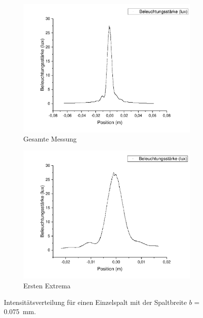 \documentclass[
	a4paper,
	12pt,
	pagesize,
	ngerman
]{scrartcl}
\begin{document}
	\begin{figure}[H]
		\centering
		\begin{subfigure}{.5\textwidth}
			\centering
			\includegraphics[width=1\linewidth]{Einzelspalt0-075mm}
			\caption{Gesamte Messung}	
		\end{subfigure}%
		\begin{subfigure}{.5\textwidth}
			\centering
			\includegraphics[width=1\linewidth]{Einzelspalt0-075mmZOOM}
			\caption{Ersten Extrema}
		\end{subfigure}
		\label{Einzelspalt0-075mm}
		\caption{Intensitätsverteilung für einen Einzelspalt mit der Spaltbreite $b$ = \SI{0,075}{mm}.}
	\end{figure}	
\end{document}
